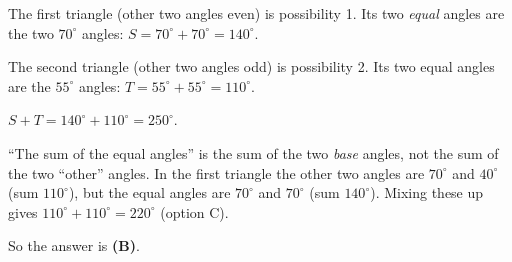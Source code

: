 {
The first triangle (other two angles even) is possibility 1. Its two \emph{equal} angles are the two $70^\circ$ angles: $S=70^\circ+70^\circ=140^\circ$.\par
The second triangle (other two angles odd) is possibility 2. Its two equal angles are the $55^\circ$ angles: $T=55^\circ+55^\circ=110^\circ$.

$S+T=140^\circ+110^\circ=250^\circ$.
\begin{warnbox}``The sum of the equal angles'' is the sum of the two \emph{base} angles, not the sum of the two ``other'' angles. In the first triangle the other two angles are $70^\circ$ and $40^\circ$ (sum $110^\circ$), but the equal angles are $70^\circ$ and $70^\circ$ (sum $140^\circ$). Mixing these up gives $110^\circ+110^\circ=220^\circ$ (option C).\end{warnbox}
So the answer is \textbf{(B)}.
}

